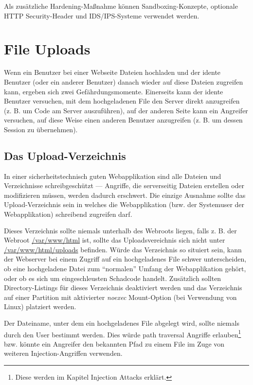 Als zusätzliche Hardening-Maßnahme können Sandboxing-Konzepte, optionale HTTP Security-Header und IDS/IPS-Systeme verwendet werden.

\section{File Uploads}

Wenn ein Benutzer bei einer Webseite Dateien hochladen und der idente Benutzer (oder ein anderer Benutzer) danach wieder auf diese Dateien zugreifen kann, ergeben sich zwei Gefährdungsmomente. Einerseits kann der idente Benutzer versuchen, mit dem hochgeladenen File den Server direkt anzugreifen (z. B. um Code am Server auszuführen), auf der anderen Seite kann ein Angreifer versuchen, auf diese Weise einen anderen Benutzer anzugreifen (z. B. um dessen Session zu übernehmen).

\subsection{Das Upload-Verzeichnis}

In einer sicherheitstechnisch guten Webapplikation sind alle Dateien und Verzeichnisse schreibgeschützt --- Angriffe, die serverseitig Dateien erstellen oder modifizieren müssen, werden dadurch erschwert. Die einzige Ausnahme sollte das Upload-Verzeichnis sein in welches die Webapplikation (bzw. der Systemuser der Webapplikation) schreibend zugreifen darf.

Dieses Verzeichnis sollte niemals unterhalb des Webroots liegen, falls z. B. der Webroot \url{/var/www/html} ist, sollte das Uploadsvereichnis sich nicht unter \url{/var/www/html/uploads} befinden. Würde das Verzeichnis so situiert sein, kann der Webserver bei einem Zugriff auf ein hochgeladenes File schwer unterscheiden, ob eine hochgeladene Datei zum ``normalen'' Umfang der Webapplikation gehört, oder ob es sich um eingeschleusten Schadcode handelt. Zusätzlich sollten Directory-Listings für dieses Verzeichnis deaktiviert werden und das Verzeichnis auf einer Partition mit aktivierter \textit{noexec} Mount-Option (bei Verwendung von Linux) platziert werden.

Der Dateiname, unter dem ein hochgeladenes File abgelegt wird, sollte niemals durch den User bestimmt werden. Dies würde path traversal Angriffe erlauben\footnote{Diese werden im Kapitel Injection Attacks erklärt.} bzw. könnte ein Angreifer den bekannten Pfad zu einem File im Zuge von weiteren Injection-Angriffen verwenden.

